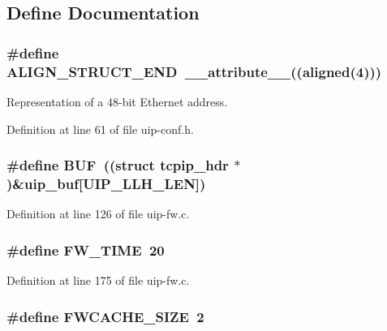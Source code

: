 \subsection{Define Documentation}
\hypertarget{group__uipfw_ga8dbc55e1183365cafdd75d7c18215bb2}{
\subsubsection[{ALIGN\_\-STRUCT\_\-END}]{\setlength{\rightskip}{0pt plus 5cm}\#define {\bf ALIGN\_\-STRUCT\_\-END}~\_\-\_\-attribute\_\-\_\-((aligned(4)))}}
\label{group__uipfw_ga8dbc55e1183365cafdd75d7c18215bb2}
Representation of a 48-\/bit Ethernet address. 

Definition at line 61 of file uip-\/conf.h.

\hypertarget{group__uipfw_ga24f52ac52d6e714cb04a5aa01be3bdd0}{
\subsubsection[{BUF}]{\setlength{\rightskip}{0pt plus 5cm}\#define BUF~((struct {\bf tcpip\_\-hdr} $\ast$)\&{\bf uip\_\-buf}\mbox{[}UIP\_\-LLH\_\-LEN\mbox{]})}}
\label{group__uipfw_ga24f52ac52d6e714cb04a5aa01be3bdd0}


Definition at line 126 of file uip-\/fw.c.

\hypertarget{group__uipfw_ga37a94c7dd987d85126d49aba7ed5ffe7}{
\subsubsection[{FW\_\-TIME}]{\setlength{\rightskip}{0pt plus 5cm}\#define FW\_\-TIME~20}}
\label{group__uipfw_ga37a94c7dd987d85126d49aba7ed5ffe7}


Definition at line 175 of file uip-\/fw.c.

\hypertarget{group__uipfw_ga628391fb3eeb786fe6246dc4fc0c3554}{
\subsubsection[{FWCACHE\_\-SIZE}]{\setlength{\rightskip}{0pt plus 5cm}\#define FWCACHE\_\-SIZE~2}}
\label{group__uipfw_ga628391fb3eeb786fe6246dc4fc0c3554}


